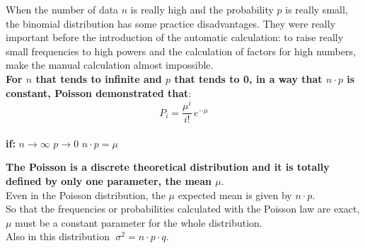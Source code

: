 
\begin{frame}
  \vspace*{.25cm}
  When the number of data $ n $ is really high and the probability $ p $ is really small, the binomial distribution has some practice disadvantages. They were really important before the introduction of the automatic calculation: to raise really small frequencies to high powers and the calculation of factors for high numbers, make the manual calculation almost impossible.\\
  \vspace*{.25cm}
  \textbf{For {\boldmath $ n $} that tends to infinite and {\boldmath $ p $} that tends to 0, in a way that $n \cdot p$ is constant, Poisson demonstrated that}:\\
  \vspace*{.25cm}
  $$ P_i = \frac{\mu^i}{i!}\, e^{-\mu} $$\\
  \vspace*{.5cm}
  \textbf{if:} \hspace{1 cm} $n\rightarrow \infty$ \hspace{1 cm} $p\rightarrow 0$ \hspace{1 cm} $n \cdot p = \mu$
\end{frame}

\begin{frame}
  \vspace*{.25cm}
  \textbf{The Poisson is a discrete theoretical distribution and it is totally defined by only one parameter, the mean {\boldmath $ \mu $}}.\\
  \vspace*{.5cm}
  Even in the Poisson distribution, the {\boldmath $ \mu $} expected mean is given by {\boldmath $n \cdot p $}.\\ 
  \vspace*{.5cm}
  So that the frequencies or probabilities calculated with the Poisson law are exact, $\mu$ must be a constant parameter for the whole distribution.\\
  \vspace*{.5cm}
  Also in this distribution {\boldmath $ \; \sigma^2 = n \cdot p \cdot q $}.\\
\end{frame}

